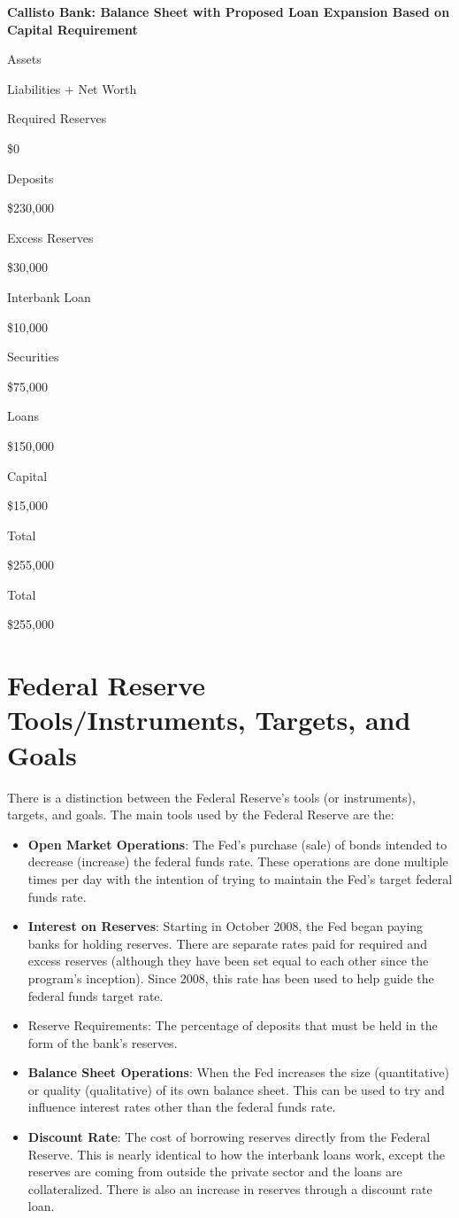 \documentclass[
]{book}
\providecommand{\tightlist}{%
  \setlength{\itemsep}{0pt}\setlength{\parskip}{0pt}}
\begin{document}
\label{tab:t30}\textbf{Callisto Bank: Balance Sheet with Proposed Loan Expansion Based on Capital Requirement}

Assets

Liabilities + Net Worth

Required Reserves

\$0

Deposits

\$230,000

Excess Reserves

\$30,000

Interbank Loan

\$10,000

Securities

\$75,000

Loans

\$150,000

Capital

\$15,000

Total

\$255,000

Total

\$255,000

\hypertarget{federal-reserve-toolsinstruments-targets-and-goals}{%
\section{Federal Reserve Tools/Instruments, Targets, and Goals}\label{federal-reserve-toolsinstruments-targets-and-goals}}

There is a distinction between the Federal Reserve's tools (or instruments), targets, and goals. The main tools used by the Federal Reserve are the:

\begin{itemize}
\tightlist
\item
  \textbf{Open Market Operations}: The Fed's purchase (sale) of bonds intended to decrease (increase) the federal funds rate. These operations are done multiple times per day with the intention of trying to maintain the Fed's target federal funds rate.
\item
  \textbf{Interest on Reserves}: Starting in October 2008, the Fed began paying banks for holding reserves. There are separate rates paid for required and excess reserves (although they have been set equal to each other since the program's inception). Since 2008, this rate has been used to help guide the federal funds target rate.
\item
  Reserve Requirements: The percentage of deposits that must be held in the form of the bank's reserves.
\item
  \textbf{Balance Sheet Operations}: When the Fed increases the size (quantitative) or quality (qualitative) of its own balance sheet. This can be used to try and influence interest rates other than the federal funds rate.
\item
  \textbf{Discount Rate}: The cost of borrowing reserves directly from the Federal Reserve. This is nearly identical to how the interbank loans work, except the reserves are coming from outside the private sector and the loans are collateralized. There is also an increase in reserves through a discount rate loan.
\end{itemize}
\end{document}
